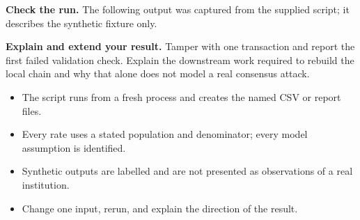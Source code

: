 

\textbf{Check the run.} The following output was captured from the supplied script; it describes the synthetic fixture only.



\begin{verification}
\textbf{Explain and extend your result.} Tamper with one transaction and report the first failed validation check. Explain the downstream work required to rebuild the local chain and why that alone does not model a real consensus attack.

\begin{itemize}\item The script runs from a fresh process and creates the named CSV or report files.\item Every rate uses a stated population and denominator; every model assumption is identified.\item Synthetic outputs are labelled and are not presented as observations of a real institution.\item Change one input, rerun, and explain the direction of the result.\end{itemize}\end{verification}
